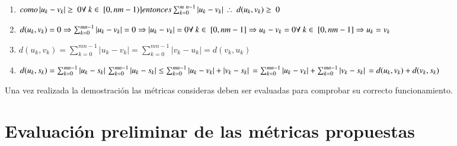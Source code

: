 \begin{enumerate}
\item \(como \left | u_{k}- v_{k}\right | \geq~0 \forall~k \in~[0,nm-1)] \\ entonces  \sum_{k=0}^{m\ n-1} \left | u_{k}- v_{k}\right | \\ \therefore~d(u_{k},v_{k})\geq~0\)

\item \(d(u_{k},v_{k}) = 0 \\ \Rightarrow \sum_{k=0}^{mn-1} \left | u_{k}- v_{k}\right | = 0 \\ \Rightarrow  \left | u_{k}- v_{k}\right | = 0 \forall~k \in~[0,nm-1] \\ \Rightarrow  u_{k}- v_{k} = 0 \forall~k \in~[0,nm-1] \\ \Rightarrow  u_{k} = v_{k} \)

\item \(d(u_{k},v_{k})=\sum_{k=0}^{mn-1} \left | u_{k}- v_{k}\right | = \sum_{k=0}^{mn-1} \left | v_{k}- u_{k}\right | =  d(v_{k},u_{k}) \)

\item \( d(u_{k},s_{k})=\sum_{k=0}^{mn-1} \left | u_{k} - s_{k}\right | \\
\sum_{k=0}^{mn-1} \left | u_{k} - s_{k}\right | \leq \sum_{k=0}^{mn-1} \left | u_{k} - v_{k}\right | + \left | v_{k} - s_{k}\right | \\
= \sum_{k=0}^{mn-1} \left | u_{k} - v_{k}\right | + \sum_{k=0}^{mn-1} \left | v_{k} - s_{k}\right | \\
= d(u_{k},v_{k}) + d(v_{k},s_{k}) \)

\end{enumerate}


Una vez realizada la demostración las métricas consideras deben ser evaluadas para comprobar su correcto funcionamiento. 

\section{Evaluaci\'on preliminar de las m\'etricas propuestas}
\label{metricas:evaluacion}



